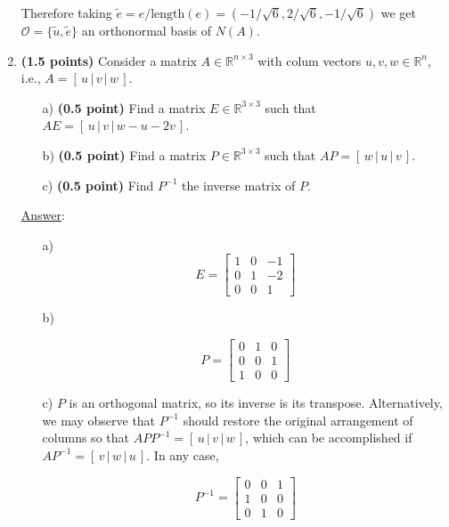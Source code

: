 \documentclass[]{book}
\theoremstyle{definition}
\newcommand{\length}{\textrm{length}}
\newcommand\ans{\underline{Answer}: }
\begin{document}
\begin{enumerate}
Therefore taking $\tilde{e} = e/\length(e) = (-1/\sqrt{6},2/\sqrt{6},-1/\sqrt{6})$ we get 
$\mathcal{O}=\{\tilde{u}, \tilde{e}\}$ an orthonormal basis of $N(A)$.


\item {\bf (1.5 points)} Consider a matrix $A\in\mathbb{R}^{n\times 3}$ with colum vectors $u, v, w \in\mathbb{R}^n$, i.e., $A=[\, u \,|\, v \,|\, w \,]$.

\begin{itemize}
\item[a)] {\bf (0.5 point)} Find a matrix $E\in\mathbb{R}^{3\times 3}$ such that $AE=[\,u \,|\, v \,|\, w-u-2v\,]$.
\item[b)] {\bf (0.5 point)} Find a matrix $P\in\mathbb{R}^{3\times 3}$ such that $AP = [\,w \,|\, u \,|\, v\,]$.
\item[c)] {\bf (0.5 point)} Find $P^{-1}$ the inverse matrix of $P$.
\end{itemize}

\ans

\begin{itemize}
\item[a)] 
\[
E = \begin{bmatrix}
1 & 0 & -1 \\
0 & 1 & -2 \\
0 & 0 & 1
\end{bmatrix}
\]

\item[b)] 

\[
P = \begin{bmatrix}
0 & 1 & 0 \\
0 & 0 & 1 \\
1 & 0 & 0
\end{bmatrix}
\]

\item[c)] $P$ is an orthogonal matrix, so its inverse is its transpose. Alternatively, we may observe that $P^{-1}$ should restore the original arrangement of columns so that $APP^{-1} = [\,u \,|\, v \,|\, w\,]$, which can be accomplished if $AP^{-1}=[\, v \,|\, w \,|\, u\,]$. In any case,

\[
P^{-1} = \begin{bmatrix}
0 & 0 & 1 \\
1 & 0 & 0 \\
0 & 1 & 0
\end{bmatrix}
\]


\end{itemize}



\end{enumerate}
\end{document}
